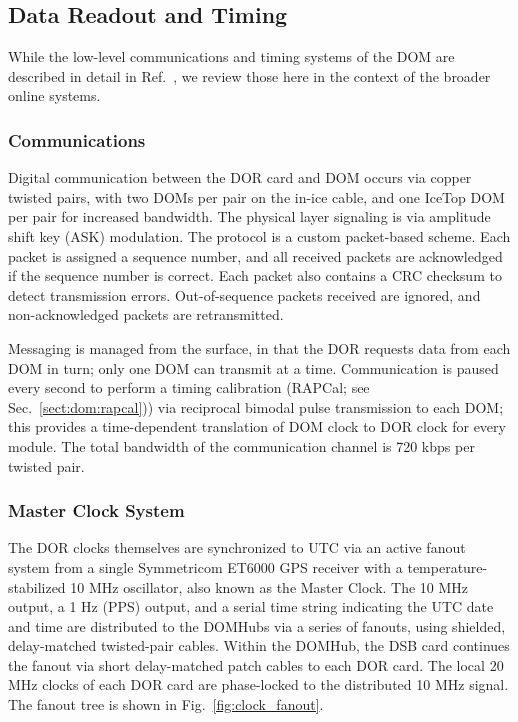 \subsection{Data Readout and Timing}

While the low-level communications and timing systems of the DOM are
described in detail in Ref.~\cite{ref:domdaq}, we review those here in the
context of the broader online systems.

\subsubsection{\label{sect:online:comms}Communications}

Digital communication between the DOR card and DOM occurs via copper
twisted pairs, with two DOMs per pair on the in-ice cable, and one IceTop
DOM per pair for increased bandwidth.  The physical layer signaling is via
amplitude shift key (ASK) modulation.  The protocol is a custom
packet-based scheme.  Each packet is assigned a sequence number, and all
received packets are acknowledged if the sequence number is correct.  Each
packet also contains a CRC checksum to detect transmission errors.
Out-of-sequence packets received are ignored, and non-acknowledged packets
are retransmitted.

Messaging is managed from the surface, in that the DOR requests data from
each DOM in turn; only one DOM can transmit at a time.  Communication is
paused every second to perform a timing calibration (RAPCal; see
Sec.~\ref{sect:dom:rapcal})) via reciprocal bimodal pulse transmission to
each DOM; this provides a time-dependent translation of DOM clock to DOR
clock for every module.  The total bandwidth of the communication channel
is 720 kbps per twisted pair.


\subsubsection{\label{sect:online:master_clock}Master Clock System}

The DOR clocks themselves are synchronized to UTC via an active fanout
system from a single Symmetricom ET6000 GPS receiver with a
temperature-stabilized 10 MHz oscillator, also known as the Master Clock.
The 10 MHz output, a 1 Hz (PPS) output, and a serial time string indicating
the UTC date and time are distributed to the DOMHubs via a series of
fanouts, using shielded, delay-matched twisted-pair cables.  Within the
DOMHub, the DSB card continues the fanout via short delay-matched patch
cables to each DOR card.  The local 20 MHz clocks of each DOR card are
phase-locked to the distributed 10 MHz signal.  The fanout tree is shown in
Fig.~\ref{fig:clock_fanout}.

